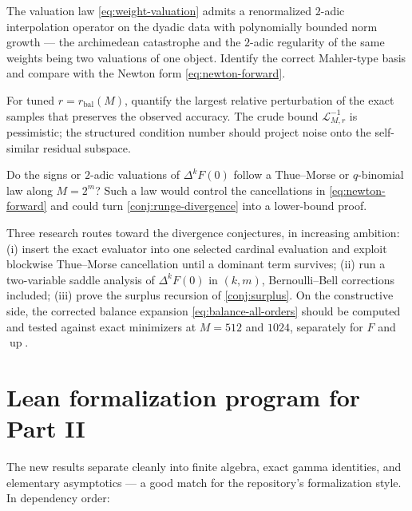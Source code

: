 \documentclass[11pt,oneside]{article}
\numberwithin{equation}{section}
\theoremstyle{definition}
\theoremstyle{remark}
\newcommand{\Up}{\operatorname{up}}
\newcommand{\Leb}{\mathscr L}
\begin{document}
\begin{conjecture}
\label{conj:2adic-stability}
The valuation law \eqref{eq:weight-valuation} admits a renormalized
$2$-adic interpolation operator on the dyadic data with polynomially
bounded norm growth --- the archimedean catastrophe and the $2$-adic
regularity of the same weights being two valuations of one object.
Identify the correct Mahler-type basis and compare with the Newton
form \eqref{eq:newton-forward}.
\end{conjecture}

\begin{problem}
For tuned $r=r_{\mathrm{bal}}(M)$, quantify the largest relative
perturbation of the exact samples that preserves the observed
accuracy.  The crude bound $\Leb_{M,r}^{-1}$ is pessimistic; the
structured condition number should project noise onto the
self-similar residual subspace.
\end{problem}

\begin{question}
Do the signs or $2$-adic valuations of $\Delta^{k}F(0)$ follow a
Thue--Morse or $q$-binomial law along $M=2^{m}$?  Such a law would
control the cancellations in \eqref{eq:newton-forward} and could turn
\cref{conj:runge-divergence} into a lower-bound proof.
\end{question}

Three research routes toward the divergence conjectures, in
increasing ambition: (i) insert the exact evaluator into one selected
cardinal evaluation and exploit blockwise Thue--Morse cancellation
until a dominant term survives; (ii) run a two-variable saddle
analysis of $\Delta^{k}F(0)$ in $(k,m)$, Bernoulli--Bell corrections
included; (iii) prove the surplus recursion of
\cref{conj:surplus}.  On the constructive side, the corrected balance
expansion \eqref{eq:balance-all-orders} should be computed and tested
against exact minimizers at $M=512$ and $1024$, separately for $F$
and $\Up$.

\section{Lean formalization program for Part II}
\label{sec:lean-interp}

The new results separate cleanly into finite algebra, exact gamma
identities, and elementary asymptotics --- a good match for the
repository's formalization style.  In dependency order:
\end{document}
